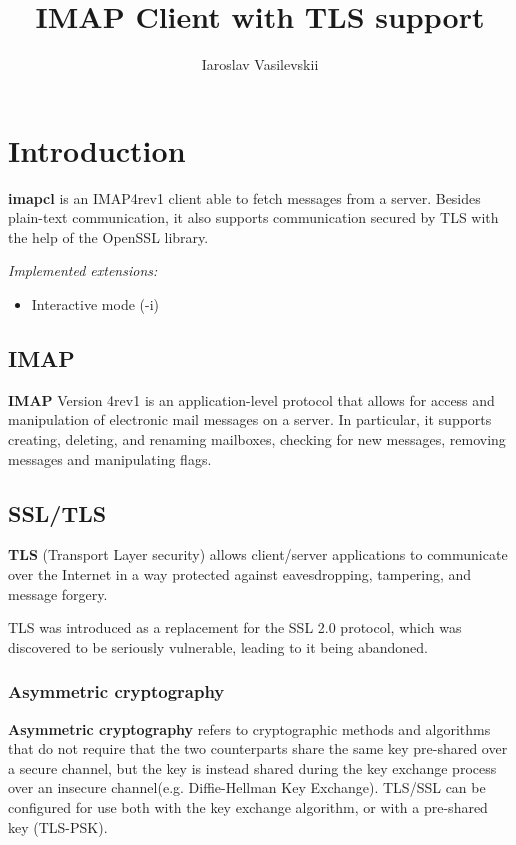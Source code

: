 \documentclass[a4]{report}
\title{IMAP Client with TLS support}
\author{Iaroslav Vasilevskii}
\begin{document}
\maketitle
\tableofcontents

\chapter{Introduction}

{\Large\textbf{imapcl}} is an IMAP4rev1\cite{rfc3501} client able to fetch messages from a server. Besides plain-text communication, it also supports communication secured by TLS with the help of the OpenSSL library.

\textit{Implemented extensions:}
\begin{itemize}
  \item Interactive mode (-i)
\end{itemize}

\section{IMAP}

\textbf{IMAP} Version 4rev1 is an application-level protocol that allows for access and manipulation of electronic mail messages on a server. In particular, it supports creating, deleting, and renaming mailboxes, checking for new messages, removing messages and manipulating flags\cite{rfc3501}.

\section{SSL/TLS}

\textbf{TLS} (Transport Layer security) allows client/server applications to communicate over the Internet in a way protected against eavesdropping, tampering, and message forgery\cite{rfc8446}.

TLS was introduced as a replacement for the SSL 2.0 protocol, which was discovered to be seriously vulnerable, leading to it being abandoned\cite{rfc6176}.

\subsection{Asymmetric cryptography}

\textbf{Asymmetric cryptography} refers to cryptographic methods and algorithms that do not require that the two counterparts share the same key pre-shared over a secure channel, but the key is instead shared during the key exchange process over an insecure channel(e.g. Diffie-Hellman Key Exchange). TLS/SSL can be configured for use both with the key exchange algorithm, or with a pre-shared key (TLS-PSK)\cite{rfc8446}.
\end{document}
